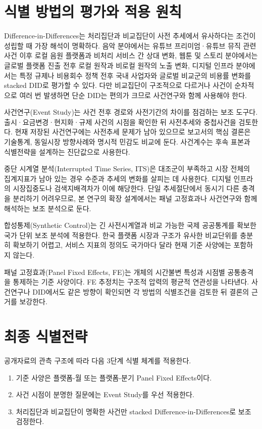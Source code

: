 \documentclass[11pt,a4paper]{report}
\begin{document}
\section{식별 방법의 평가와 적용 원칙}
Difference-in-Differences는 처리집단과 비교집단이 사전 추세에서 유사하다는 조건이 성립할 때 가장 해석이 명확하다. 음악 분야에서는 유튜브 프리미엄·유튜브 뮤직 관련 사건 이후 로컬 음원 플랫폼과 비처리 서비스 간 상대 변화, 웹툰 및 스토리 분야에서는 글로벌 플랫폼 진출 전후 로컬 원작과 비로컬 원작의 노출 변화, 디지털 인프라 분야에서는 특정 규제나 비용회수 정책 전후 국내 사업자와 글로벌 비교군의 비용률 변화를 stacked DID로 평가할 수 있다. 다만 비교집단이 구조적으로 다르거나 사건이 순차적으로 여러 번 발생하면 단순 DID는 편의가 크므로 사건연구와 함께 사용해야 한다.

사건연구(Event Study)는 사건 전후 경로와 사전기간의 차이를 점검하는 보조 도구다. 출시·요금변경·현지화·규제 사건의 시점을 확인한 뒤 사전추세와 중첩사건을 검토한다. 현재 저장된 사건연구에는 사전추세 문제가 남아 있으므로 보고서의 핵심 결론은 기술통계, 동일시장 방향사례와 명시적 민감도 비교에 둔다. 사건계수는 후속 표본과 식별전략을 설계하는 진단값으로 사용한다.

중단 시계열 분석(Interrupted Time Series, ITS)은 대조군이 부족하고 시장 전체의 집계지표가 남아 있는 경우 수준과 추세의 변화를 살피는 데 사용한다. 디지털 인프라의 시장집중도나 검색지배격차가 이에 해당한다. 단일 추세절단에서 동시기 다른 충격을 분리하기 어려우므로, 본 연구의 확장 설계에서는 패널 고정효과나 사건연구와 함께 해석하는 보조 분석으로 둔다.

합성통제(Synthetic Control)는 긴 사전시계열과 비교 가능한 국제 공공통계를 확보한 국가 단위 보조 분석에 적용한다. 한국 플랫폼 시장과 구조가 유사한 비교단위를 충분히 확보하기 어렵고, 서비스 지표의 정의도 국가마다 달라 현재 기준 사양에는 포함하지 않는다.

패널 고정효과(Panel Fixed Effects, FE)는 개체의 시간불변 특성과 시점별 공통충격을 통제하는 기준 사양이다. FE 추정치는 구조적 압력의 평균적 연관성을 나타낸다. 사건연구나 DID에서도 같은 방향이 확인되면 각 방법의 식별조건을 검토한 뒤 결론의 근거를 보강한다.

\section{최종 식별전략}
공개자료의 관측 구조에 따라 다음 3단계 식별 체계를 적용한다.
\begin{enumerate}[label=\arabic*.]
  \item 기준 사양은 플랫폼-월 또는 플랫폼-분기 Panel Fixed Effects이다.
  \item 사건 시점이 분명한 질문에는 Event Study를 우선 적용한다.
  \item 처리집단과 비교집단이 명확한 사건만 stacked Difference-in-Differences로 보조 검정한다.
\end{enumerate}
\end{document}
